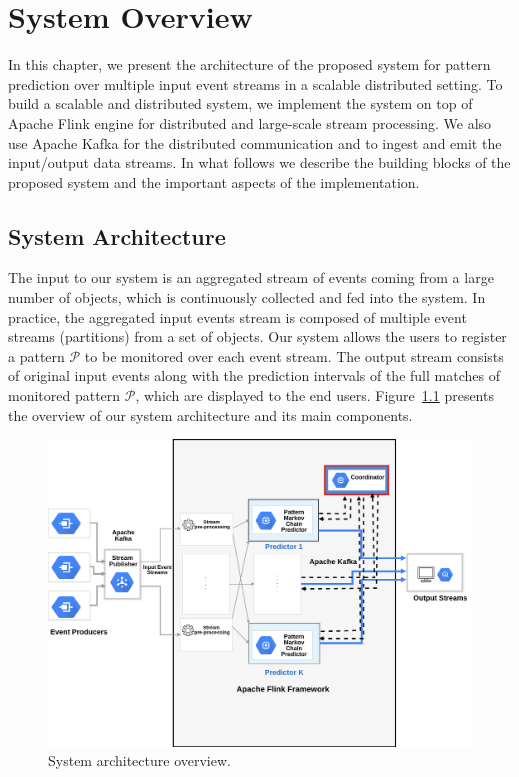 

\chapter{System Overview}
\label{chapter:overview}


\par In this chapter, we present the architecture of the proposed system for pattern prediction over multiple input event streams in a scalable distributed setting. To build a scalable and distributed system, we implement the system on top of Apache Flink engine for distributed and large-scale stream processing. We also use Apache Kafka for the distributed communication and to ingest and emit the input/output data streams. In what follows we describe the building blocks of the proposed system and the important aspects of the implementation.

\section{System Architecture}
\label{sec:architecture}
The input to our system is an aggregated stream of events coming from a large number of  objects, which is continuously collected and fed into the system. In practice, the aggregated input events stream is composed of multiple event streams (partitions) from a set of objects. Our system allows the users to register a pattern $\mathcal{P}$ to be monitored over each event stream. The output stream consists of original input events along with  the prediction intervals of the full matches of monitored pattern $\mathcal{P}$, which are displayed to the end users. Figure~\ref{fig:architecture} presents the overview of our system architecture and its main components.      


\begin{figure}[h]
	\centering
	\includegraphics[width=\linewidth]{chapters/figures/system_v2.png}
	
	\caption{System architecture overview.}
	\label{fig:architecture}
\end{figure}


